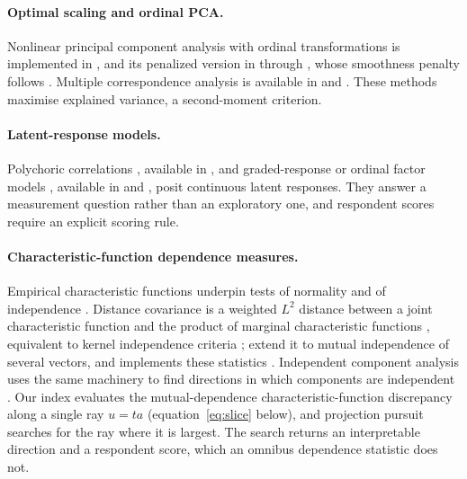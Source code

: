 \paragraph{Optimal scaling and ordinal PCA.} Nonlinear principal component analysis with ordinal transformations is implemented in  \citep{Gifi,deleeuw2009}, and its penalized version in  through  \citep{hoshiyar2023,hoshiyar2021}, whose smoothness penalty follows \citet{gertheiss2009}. Multiple correspondence analysis is available in  and  \citep{le2008,nenadic2007,greenacre2017}. These methods maximise explained variance, a second-moment criterion.

\paragraph{Latent-response models.} Polychoric correlations \citep{olsson1979}, available in  \citep{psych}, and graded-response or ordinal factor models \citep{samejima1969}, available in  and  \citep{chalmers2012,rosseel2012}, posit continuous latent responses. They answer a measurement question rather than an exploratory one, and respondent scores require an explicit scoring rule.

\paragraph{Characteristic-function dependence measures.} Empirical characteristic functions underpin tests of normality \citep{epps1983} and of independence \citep{feuerverger1977,feuerverger1993}. Distance covariance is a weighted $L^2$ distance between a joint characteristic function and the product of marginal characteristic functions \citep{szekely2007,szekely2009}, equivalent to kernel independence criteria \citep{gretton2008,sejdinovic2013}; \citet{bakirov2006} extend it to mutual independence of several vectors, and  implements these statistics \citep{energy}. Independent component analysis uses the same machinery to find directions in which components are independent \citep{hyvarinen2000,eriksson2003,matteson2017}. Our index evaluates the mutual-dependence characteristic-function discrepancy along a single ray $u=ta$ (equation~\ref{eq:slice} below), and projection pursuit searches for the ray where it is largest. The search returns an interpretable direction and a respondent score, which an omnibus dependence statistic does not.

